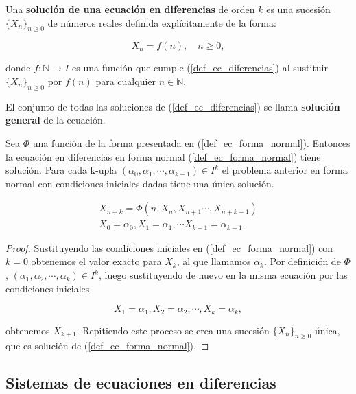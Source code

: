 \begin{definition}
Una \textbf{solución de una ecuación en diferencias} de orden $k$ es una sucesión $\{X_n\}_{n\geq 0}$ de números reales definida explícitamente de la forma:

$$X_n = f(n),\quad n\geq 0,$$

donde $f: \mathbb{N} \rightarrow I$ es una función que cumple (\ref{def_ec_diferencias}) al sustituir $\{X_n\}_{n\geq 0}$ por $f(n)$ para cualquier $n\in\mathbb{N}$.

El conjunto de todas las soluciones de (\ref{def_ec_diferencias}) se llama \textbf{solución general} de la ecuación.
\end{definition}

\begin{theorem}
Sea $\Phi$ una función de la forma presentada en (\ref{def_ec_forma_normal}). Entonces la ecuación en diferencias en forma normal (\ref{def_ec_forma_normal}) tiene solución.
Para cada k-upla $(\alpha_0, \alpha_1, \cdots ,\alpha_{k-1})\in I^{k}$ el problema anterior en forma normal con condiciones iniciales dadas tiene una única solución.

\begin{equation}
\begin{aligned}
X_{n+k} = \Phi (n, X_n, X_{n+1}\cdots , X_{n+k-1}) \\
X_0 = \alpha_0, X_1=\alpha_1, \cdots X_{k-1}=\alpha_{k-1}.
\end {aligned}
\end{equation}

\end{theorem}
\begin{proof}
Sustituyendo las condiciones iniciales en (\ref{def_ec_forma_normal}) con $k=0$ obtenemos el valor exacto para $X_k$, al que llamamos $\alpha_k$. Por definición de $\Phi$, $(\alpha_1, \alpha_2, \cdots ,\alpha_{k})\in I^{k}$, luego sustituyendo de nuevo en la misma ecuación por las condiciones iniciales

$$X_1 = \alpha_1, X_2=\alpha_2, \cdots , X_{k}=\alpha_{k},$$

obtenemos $X_{k+1}$. Repitiendo este proceso se crea una sucesión $\{X_n\}_{n\geq 0}$ única, que es solución de (\ref{def_ec_forma_normal}).
\end{proof}


\subsection{Sistemas de ecuaciones en diferencias}

